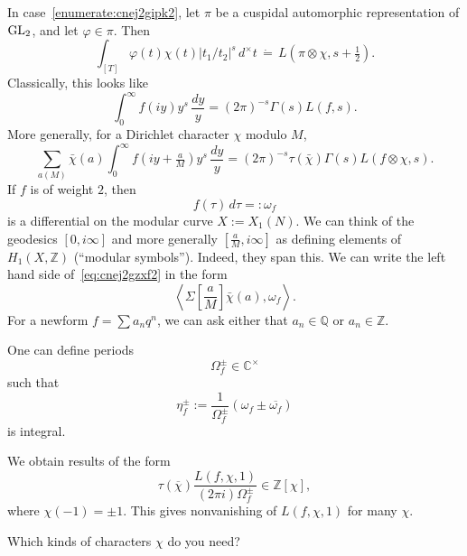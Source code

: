\documentclass[reqno]{amsart} 
\begin{document}
In case~\eqref{enumerate:cnej2gipk2}, let $\pi$ be a cuspidal automorphic representation of $\operatorname{GL}_2$, and let $\varphi \in \pi$.  Then
\begin{equation*}
  \int_{[T]} \varphi(t) \chi(t) \lvert t_1 / t_2 \rvert^s \, d^\times t
  \, \dot{=}\,
  L(\pi \otimes \chi, s + \tfrac{1}{2}).
\end{equation*}
Classically, this looks like
\begin{equation*}
  \int_0^\infty f(i y ) y^s \, \frac{d y}{y}
  ={(2 \pi)}^{- s} \Gamma(s) L(f, s).
\end{equation*}
More generally, for a Dirichlet character $\chi$ modulo $M$,
\begin{equation}\label{eq:cnej2gzxf2}
  \sum_{a (M)} \bar{\chi}(a) \int_0^\infty f(i y + \tfrac{a}{M} ) y^s \, \frac{d y}{y}
  =(2 \pi )^{- s} \tau(\bar{\chi})\Gamma(s) L(f \otimes \chi, s).
\end{equation}
If $f$ is of weight $2$, then
\begin{equation*}
  f(\tau) \, d \tau =: \omega_f 
\end{equation*}
is a differential on the modular curve $X := X_1(N)$.  We can think of the geodesics $[0,i \infty]$ and more generally $[ \tfrac{a}{M}, i \infty ]$ as defining elements of $H_1(X, \mathbb{Z})$ (``modular symbols'').  Indeed, they span this.  We can write the left hand side of~\eqref{eq:cnej2gzxf2} in the form
\begin{equation*}
  \left\langle \Sigma \left[ \frac{a}{M} \right]  \bar{\chi}(a), \omega_f \right\rangle.
\end{equation*}
For a newform $f= \sum a_n q^n$, we can ask either that $a_n \in \mathbb{Q}$ or $a_n \in \mathbb{Z}$.

One can define periods
\begin{equation*}
  \Omega_f^{\pm} \in \mathbb{C}^\times
\end{equation*}
such that
\begin{equation*}
  \eta_f^{\pm} := \frac{1}{ \Omega_f^{\pm} } \left( \omega_f \pm \overline{\omega_f} \right)
\end{equation*}
is integral.

We obtain results of the form
\begin{equation*}
  \tau(\overline{\chi})
  \frac{L(f, \chi, 1)}{(2 \pi i) \Omega_f^{\pm}}  \in \mathbb{Z} [\chi],
\end{equation*}
where $\chi(-1) = \pm 1$.  This gives nonvanishing of $L(f, \chi, 1)$ for many $\chi$.
\begin{question}
  Which kinds of characters $\chi$ do you need?
\end{question}
\end{document}
